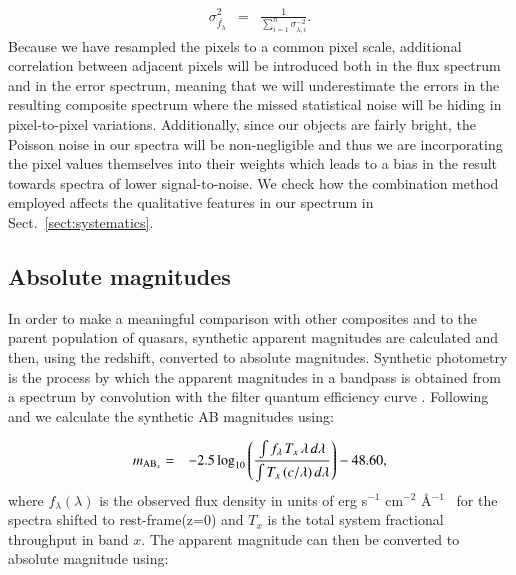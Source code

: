 \documentclass{aa}    %
\newcommand{\eqlabel}[1]{\label{eq:#1}}
\newcommand{\sectionname}{Sect.}
\newcommand{\Sect}[1]{\sectionname~\ref{sect:#1}}
\newcommand{\sect}[1]{\Sect{#1}}
\newcommand{\sectlabel}[1]{\label{sect:#1}}
\newcommand{\fluxunit}{erg s$^{-1}$ cm$^{-2}$ \AA$^{-1}$}
\begin{document}
\begin{eqnarray} \eqlabel{sigma-wmean}
\sigma_{\bar{f_{\lambda}}}^2 &=& \frac{ 1 }{\sum_{i=1}^n \sigma_{\lambda,
i}^{-2}}.
\end{eqnarray}
Because we have resampled the pixels to a common pixel scale, additional
correlation between adjacent pixels will be introduced both in the flux spectrum
and in the error spectrum, meaning that we will underestimate the errors in the
resulting composite spectrum where the missed statistical noise will be hiding
in pixel-to-pixel variations. Additionally, since our objects are fairly bright,
the Poisson noise in our spectra will be non-negligible and thus we are
incorporating the pixel values themselves into their weights which leads to a
bias in the result towards spectra of lower signal-to-noise. We check how the
combination method employed affects the qualitative features in our spectrum in
\sect{systematics}.

\subsection{Absolute magnitudes} \sectlabel{absmag}

In order to make a meaningful comparison with other composites and to the parent
population of quasars, synthetic apparent magnitudes are calculated and then,
using the redshift, converted to absolute magnitudes. Synthetic photometry is
the process by which the apparent magnitudes in a bandpass is obtained from a
spectrum by convolution with the filter quantum efficiency curve
\citep{Bessell2005}. Following \citet{Bessell2012} and \citet{Casagrande2014} we
calculate the synthetic AB magnitudes using:

\begin{eqnarray}\eqlabel{abmag}
m_{\textmd{AB}_x} &=& -2.5 \log_{10} \left(  \frac{\int f_\lambda \,  T_{x}  \,
\lambda \,  d\lambda} 
{\int  T_{x} \,  (c / \lambda) \,  d\lambda} \right) - 48.60,
\end{eqnarray}
where $f_\lambda (\lambda)$ is the observed flux density in units of \fluxunit~
for the spectra shifted to rest-frame(z=0) and $T_{x} $ is the total system
fractional throughput in band $x$. The apparent magnitude can then be converted
to absolute magnitude using:
\end{document}
